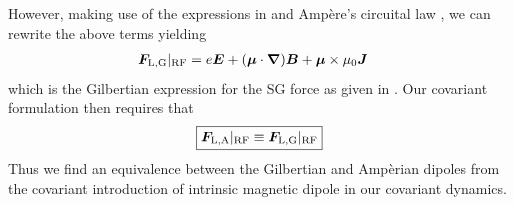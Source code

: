 However, making use of the expressions in  and Amp{\`e}re's circuital law , we can rewrite the above terms yielding
\begin{alignat}{1}
\boldsymbol{F}_\mathrm{L,G}\vert_\mathrm{RF} &= e\boldsymbol{E} +(\boldsymbol{\mu}\cdot\boldsymbol{\nabla})\boldsymbol{B}+\boldsymbol{\mu}\times\mu_{0}\boldsymbol{J}
\end{alignat}
which is the Gilbertian expression for the SG force as given in . Our covariant formulation then requires that
\begin{align}
    \boxed{\boldsymbol{F}_\mathrm{L,A}\vert_\mathrm{RF} \equiv \boldsymbol{F}_\mathrm{L,G}\vert_\mathrm{RF}}
\end{align}
Thus we find an equivalence between the Gilbertian and Amp{\`e}rian dipoles from the covariant introduction of intrinsic magnetic dipole in our covariant dynamics.

